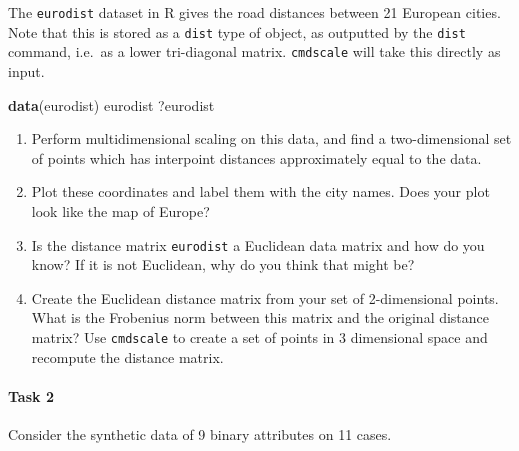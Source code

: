 \documentclass[
]{book}
\newenvironment{Shaded}{\begin{snugshade}}{\end{snugshade}}
\newcommand{\FunctionTok}[1]{\textcolor[rgb]{0.13,0.29,0.53}{\textbf{#1}}}
\newcommand{\NormalTok}[1]{#1}
\theoremstyle{definition}
\theoremstyle{definition}
\theoremstyle{definition}
\theoremstyle{definition}
\theoremstyle{remark}
\begin{document}
The \texttt{eurodist} dataset in R gives the road distances between 21 European cities. Note that this is stored as a \texttt{dist} type of object, as outputted by the \texttt{dist} command, i.e.~as a lower tri-diagonal matrix. \texttt{cmdscale} will take this directly as input.

\begin{Shaded}
\begin{Highlighting}[]
\FunctionTok{data}\NormalTok{(eurodist)}
\NormalTok{eurodist}
\NormalTok{?eurodist}
\end{Highlighting}
\end{Shaded}

\begin{enumerate}
\def\labelenumi{\roman{enumi}.}
\item
  Perform multidimensional scaling on this data, and find a two-dimensional set of points which has interpoint distances approximately equal to the data.
\item
  Plot these coordinates and label them with the city names. Does your plot look like the map of Europe?
\item
  Is the distance matrix \texttt{eurodist} a Euclidean data matrix and how do you know? If it is not Euclidean, why do you think that might be?
\item
  Create the Euclidean distance matrix from your set of 2-dimensional points. What is the Frobenius norm between this matrix and the original distance matrix? Use \texttt{cmdscale} to create a set of points in 3 dimensional space and recompute the distance matrix.
\end{enumerate}

\paragraph*{Task 2}\label{task-2-1}

Consider the synthetic data of 9 binary attributes on 11 cases.
\end{document}
